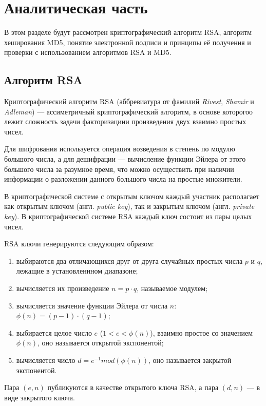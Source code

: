 \chapter{Аналитическая часть}
В этом разделе будут рассмотрен криптографический алгоритм RSA, алгоритм хеширования MD5, понятие электронной подписи и принципы её получения и проверки с использованием алгоритмов RSA и MD5.


\section{Алгоритм RSA}

Криптографический алгоритм RSA (аббревиатура от фамилий \textit{Rivest}, \linebreak\textit{Shamir} и \textit{Adleman}) --- ассиметричный криптографический алгоритм, в основе которогоо лежит сложность задачи факторизациии произведения двух взаимно простых чисел.

Для шифрования используется операция возведения в степень по модулю большого числа, а для дешифрации --- вычисление функции Эйлера от этого большого числа за разумное время, что можно осуществить при наличии информации о разложении данного большого числа на простые множители.

В криптографической системе с открытым ключом каждый участник располагает как открытым ключом (англ. \textit{public key}), так и закрытым ключом (англ. \textit{private key}). В криптографической системе RSA каждый ключ состоит из пары целых чисел. 


RSA ключи генерируются следующим образом:
\begin{enumerate}[label=\arabic*)]
	\item выбираются два отличающихся друг от друга случайных простых числа $p$ и $q$, лежащие в установленнном диапазоне;
    \item вычисляется их произведение $n = p \cdot q$, называемое модулем;
	\item вычисляется значение функции Эйлера от числа $n$: $\phi(n) = (p - 1)\cdot (q - 1)$;
	\item выбирается целое число $e$ ($1 < e < \phi(n)$), взаимно простое со значением $\phi(n)$, оно называется открытой экспонентой;
	\item вычисляется число $d  = e^{-1} mod (\phi(n))$, оно называется закрытой экспонентой.
\end{enumerate}

Пара $(e, n)$ публикуются в качестве открытого ключа RSA, а пара $(d, n)$ --- в виде закрытого ключа.


